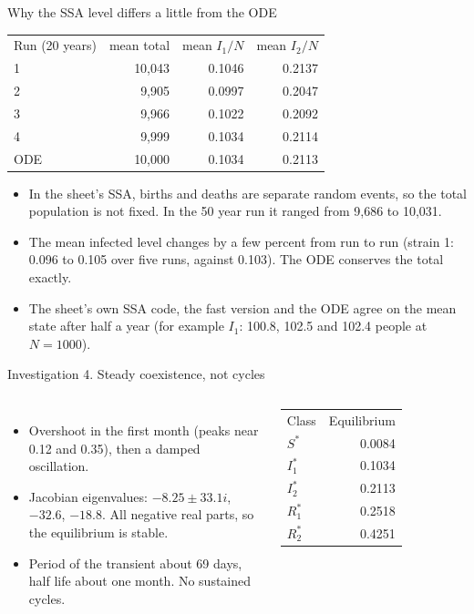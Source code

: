\begin{frame}{Why the SSA level differs a little from the ODE}
\small
\centering
\begin{tabular}{l r r r}
\rowcolor{aimsred}\color{white}Run (20 years) & \color{white}mean total & \color{white}mean $I_1/N$ & \color{white}mean $I_2/N$\\
1 & 10,043 & 0.1046 & 0.2137\\
\rowcolor{rowpink} 2 & 9,905 & 0.0997 & 0.2047\\
3 & 9,966 & 0.1022 & 0.2092\\
\rowcolor{rowpink} 4 & 9,999 & 0.1034 & 0.2114\\
ODE & 10,000 & 0.1034 & 0.2113\\
\end{tabular}
\vspace{0.8em}
\begin{itemize}\setlength\itemsep{0.5em}
  \item In the sheet's SSA, births and deaths are separate random events, so the total population is not fixed. In the 50 year run it ranged from 9,686 to 10,031.
  \item The mean infected level changes by a few percent from run to run (strain 1: 0.096 to 0.105 over five runs, against 0.103). The ODE conserves the total exactly.
  \item The sheet's own SSA code, the fast version and the ODE agree on the mean state after half a year (for example $I_1$: 100.8, 102.5 and 102.4 people at $N=1000$).
\end{itemize}
\end{frame}

\begin{frame}{Investigation 4. Steady coexistence, not cycles}
\begin{columns}[T]
\begin{itemize}\setlength\itemsep{0.5em}
  \item Overshoot in the first month (peaks near 0.12 and 0.35), then a damped oscillation.
  \item Jacobian eigenvalues: $-8.25\pm33.1i$, $-32.6$, $-18.8$. All negative real parts, so the equilibrium is stable.
  \item Period of the transient about 69 days, half life about one month. No sustained cycles.
\end{itemize}
\renewcommand{\arraystretch}{1.3}
\begin{tabular}{l r}
\rowcolor{aimsred}\color{white}Class & \color{white}Equilibrium\\
$S^*$ & 0.0084\\
\rowcolor{rowpink} $I_1^*$ & 0.1034\\
$I_2^*$ & 0.2113\\
\rowcolor{rowpink} $R_1^*$ & 0.2518\\
$R_2^*$ & 0.4251\\
\end{tabular}
\end{columns}
\vspace{0.6em}
\end{frame}

